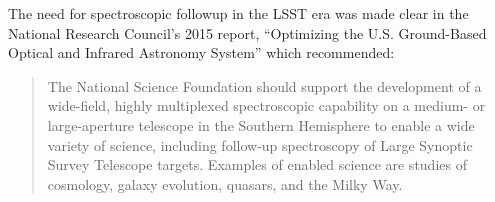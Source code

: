 \documentclass[oneside,11pt]{amsart}
\begin{document}


The need for spectroscopic followup in the LSST era was made clear in the National Research Council's 2015 report, ``Optimizing the U.S. Ground-Based Optical and Infrared Astronomy System'' \citep{NAP21722} which recommended:

\begin{quote}
The National Science Foundation should support the development of a wide-field, highly multiplexed spectroscopic capability on a medium- or large-aperture telescope in the Southern Hemisphere to enable a wide variety of science, including follow-up spectroscopy of Large Synoptic Survey Telescope targets. Examples of enabled science are studies of cosmology, galaxy evolution, quasars, and the Milky Way.
\end{quote}


\end{document}
